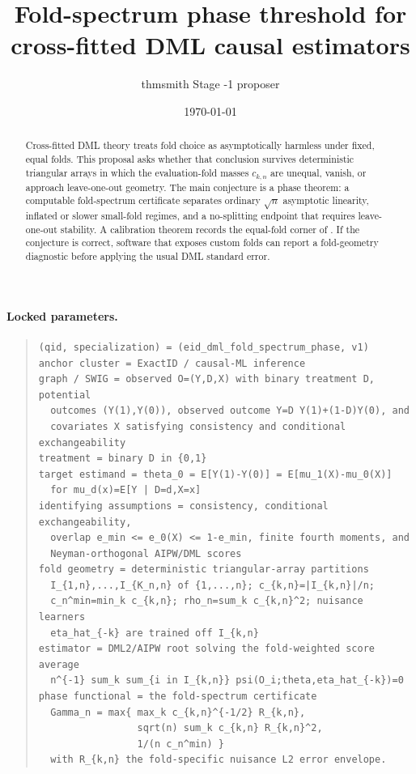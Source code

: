 \documentclass[11pt]{article}
\title{Fold-spectrum phase threshold for cross-fitted DML causal estimators}
\author{thmsmith Stage -1 proposer}
\date{\today}
\theoremstyle{definition}
\theoremstyle{plain}
\theoremstyle{remark}
\begin{document}
\maketitle


\paragraph{Locked parameters.}
\begin{quote}\small
\begin{verbatim}
(qid, specialization) = (eid_dml_fold_spectrum_phase, v1)
anchor cluster = ExactID / causal-ML inference
graph / SWIG = observed O=(Y,D,X) with binary treatment D, potential
  outcomes (Y(1),Y(0)), observed outcome Y=D Y(1)+(1-D)Y(0), and
  covariates X satisfying consistency and conditional exchangeability
treatment = binary D in {0,1}
target estimand = theta_0 = E[Y(1)-Y(0)] = E[mu_1(X)-mu_0(X)]
  for mu_d(x)=E[Y | D=d,X=x]
identifying assumptions = consistency, conditional exchangeability,
  overlap e_min <= e_0(X) <= 1-e_min, finite fourth moments, and
  Neyman-orthogonal AIPW/DML scores
fold geometry = deterministic triangular-array partitions
  I_{1,n},...,I_{K_n,n} of {1,...,n}; c_{k,n}=|I_{k,n}|/n;
  c_n^min=min_k c_{k,n}; rho_n=sum_k c_{k,n}^2; nuisance learners
  eta_hat_{-k} are trained off I_{k,n}
estimator = DML2/AIPW root solving the fold-weighted score average
  n^{-1} sum_k sum_{i in I_{k,n}} psi(O_i;theta,eta_hat_{-k})=0
phase functional = the fold-spectrum certificate
  Gamma_n = max{ max_k c_{k,n}^{-1/2} R_{k,n},
                 sqrt(n) sum_k c_{k,n} R_{k,n}^2,
                 1/(n c_n^min) }
  with R_{k,n} the fold-specific nuisance L2 error envelope.
\end{verbatim}
\end{quote}

\begin{abstract}
Cross-fitted DML theory treats fold choice as asymptotically harmless under fixed, equal folds. This proposal asks whether that conclusion survives deterministic triangular arrays in which the evaluation-fold masses \(c_{k,n}\) are unequal, vanish, or approach leave-one-out geometry. The main conjecture is a phase theorem: a computable fold-spectrum certificate separates ordinary \(\sqrt n\) asymptotic linearity, inflated or slower small-fold regimes, and a no-splitting endpoint that requires leave-one-out stability. A calibration theorem records the equal-fold corner of \citet{ChernozhukovEtAl2018DML}. If the conjecture is correct, software that exposes custom folds can report a fold-geometry diagnostic before applying the usual DML standard error.
\end{abstract}
\end{document}
